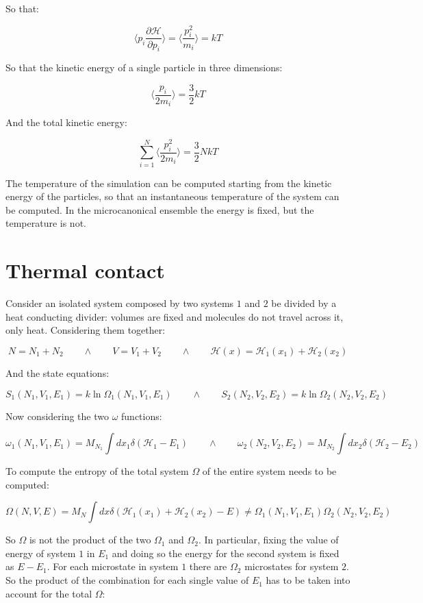 		So that:

		$$\biggl\langle p_i\frac{\partial\mathcal{H}}{\partial p_i}\biggr\rangle = \biggl\langle\frac{p_i^2}{m_i}\biggr\rangle = kT$$

		So that the kinetic energy of a single particle in three dimensions:

		$$\biggl\langle \frac{p_i}{2m_i}\biggr\rangle = \frac{3}{2}kT$$

		And the total kinetic energy:

		$$\sum\limits_{i=1}^N\biggl\langle\frac{p_i^2}{2m_i}\biggr\rangle = \frac{3}{2}NkT$$

		The temperature of the simulation can be computed starting from the kinetic energy of the particles, so that an instantaneous temperature of the system can be computed.
		In the microcanonical ensemble the energy is fixed, but the temperature is not.


\section{Thermal contact}
Consider an isolated system composed by two systems $1$ and $2$ be divided by a heat conducting divider: volumes are fixed and molecules do not travel across it, only heat.
Considering them together:

$$N = N_1+N_2\qquad\land\qquad V = V_1+V_2\qquad\land\qquad\mathcal{H}(x) = \mathcal{H}_1(x_1)+\mathcal{H}_2(x_2)$$

And the state equations:

$$S_1(N_1, V_1, E_1) = k\ln\Omega_1(N_1, V_1, E_1)\qquad\land\qquad S_2(N_2, V_2, E_2) = k\ln\Omega_2(N_2, V_2, E_2)$$

Now considering the two $\omega$ functions:

$$\omega_1(N_1, V_1, E_1) = M_{N_1}\int dx_1\delta(\mathcal{H}_1-E_1)\qquad\land\qquad\omega_2(N_2, V_2, E_2) = M_{N_2}\int dx_2\delta(\mathcal{H}_2-E_2)$$

To compute the entropy of the total system $\Omega$ of the entire system needs to be computed:

$$\Omega(N, V, E) = M_N\int dx\delta(\mathcal{H}_1(x_1) + \mathcal{H}_2(x_2)-E)\neq\Omega_1(N_1, V_1, E_1)\Omega_2(N_2, V_2, E_2)$$

So $\Omega$ is not the product of the two $\Omega_1$ and $\Omega_2$.
In particular, fixing the value of energy of system $1$ in $E_1$ and doing so the energy for the second system is fixed as $E-E_1$.
For each microstate in system $1$ there are $\Omega_2$ microstates for system $2$.
So the product of the combination for each single value of $E_1$ has to be taken into account for the total $\Omega$:

